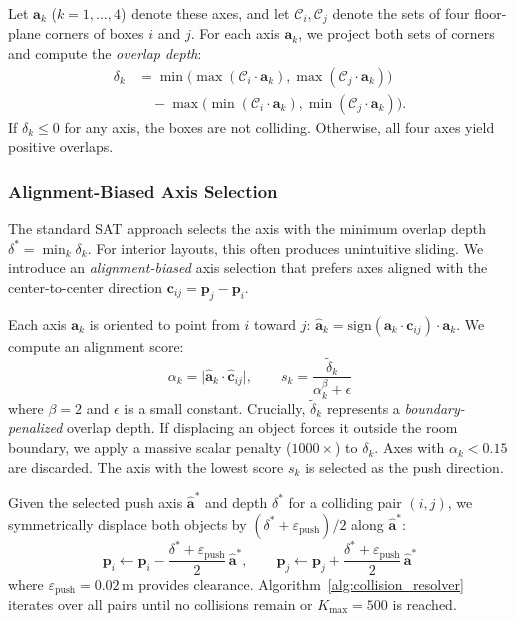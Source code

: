 Let $\mathbf{a}_k$ ($k = 1, \ldots, 4$) denote these axes, and let $\mathcal{C}_i, \mathcal{C}_j$ denote the sets of four floor-plane corners of boxes $i$ and $j$. For each axis $\mathbf{a}_k$, we project both sets of corners and compute the \emph{overlap depth}:
\begin{equation}
\begin{split}
\delta_k &= \min\!\big(\max(\mathcal{C}_i \cdot \mathbf{a}_k), \max(\mathcal{C}_j \cdot \mathbf{a}_k)\big) \\
&\quad - \max\!\big(\min(\mathcal{C}_i \cdot \mathbf{a}_k), \min(\mathcal{C}_j \cdot \mathbf{a}_k)\big).
\end{split}
\label{eq:sat_overlap}
\end{equation}
If $\delta_k \leq 0$ for any axis, the boxes are not colliding. Otherwise, all four axes yield positive overlaps.

\subsubsection{Alignment-Biased Axis Selection}
\label{sec:method:axis_selection}

The standard SAT approach selects the axis with the minimum overlap depth $\delta^* = \min_k \delta_k$. For interior layouts, this often produces unintuitive sliding. We introduce an \emph{alignment-biased} axis selection that prefers axes aligned with the center-to-center direction $\mathbf{c}_{ij} = \mathbf{p}_j - \mathbf{p}_i$. 

Each axis $\mathbf{a}_k$ is oriented to point from $i$ toward $j$: $\hat{\mathbf{a}}_k = \mathrm{sign}(\mathbf{a}_k \cdot \mathbf{c}_{ij}) \cdot \mathbf{a}_k$. We compute an alignment score:
\begin{equation}
\alpha_k = \big|\hat{\mathbf{a}}_k \cdot \hat{\mathbf{c}}_{ij}\big|, \qquad
s_k = \frac{\tilde{\delta}_k}{\alpha_k^{\beta} + \epsilon}
\label{eq:axis_score}
\end{equation}
where $\beta=2$ and $\epsilon$ is a small constant. Crucially, $\tilde{\delta}_k$ represents a \emph{boundary-penalized} overlap depth. If displacing an object forces it outside the room boundary, we apply a massive scalar penalty ($1000\times$) to $\delta_k$. Axes with $\alpha_k < 0.15$ are discarded. The axis with the lowest score $s_k$ is selected as the push direction.



Given the selected push axis $\hat{\mathbf{a}}^*$ and depth $\delta^*$ for a colliding pair $(i, j)$, we symmetrically displace both objects by $(\delta^* + \varepsilon_{\mathrm{push}}) / 2$ along $\hat{\mathbf{a}}^*$:
\begin{equation}
\mathbf{p}_i \gets \mathbf{p}_i - \frac{\delta^* + \varepsilon_{\mathrm{push}}}{2}\, \hat{\mathbf{a}}^*, \qquad
\mathbf{p}_j \gets \mathbf{p}_j + \frac{\delta^* + \varepsilon_{\mathrm{push}}}{2}\, \hat{\mathbf{a}}^*
\label{eq:push}
\end{equation}
where $\varepsilon_{\mathrm{push}} = 0.02\,\text{m}$ provides clearance. Algorithm~\ref{alg:collision_resolver} iterates over all pairs until no collisions remain or $K_{\max} = 500$ is reached.
    